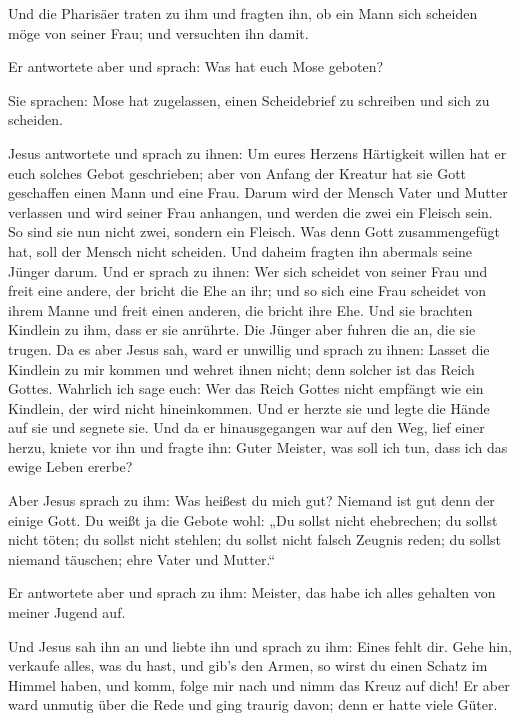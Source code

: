  Und die Pharisäer traten zu ihm und fragten ihn, ob ein
Mann sich scheiden möge von seiner Frau; und versuchten ihn damit.

 Er antwortete aber und sprach: Was hat euch Mose geboten?

 Sie sprachen: Mose hat zugelassen, einen Scheidebrief zu
schreiben und sich zu scheiden.

 Jesus antwortete und sprach zu ihnen: Um eures Herzens
Härtigkeit willen hat er euch solches Gebot geschrieben; 
aber von Anfang der Kreatur hat sie Gott geschaffen einen Mann und eine
Frau.  Darum wird der Mensch Vater und Mutter verlassen
und wird seiner Frau anhangen,  und werden die zwei ein
Fleisch sein. So sind sie nun nicht zwei, sondern ein Fleisch.
 Was denn Gott zusammengefügt hat, soll der Mensch nicht
scheiden.  Und daheim fragten ihn abermals seine Jünger
darum.  Und er sprach zu ihnen: Wer sich scheidet von
seiner Frau und freit eine andere, der bricht die Ehe an ihr;
 und so sich eine Frau scheidet von ihrem Manne und freit
einen anderen, die bricht ihre Ehe.  Und sie brachten
Kindlein zu ihm, dass er sie anrührte. Die Jünger aber fuhren die an,
die sie trugen.  Da es aber Jesus sah, ward er unwillig
und sprach zu ihnen: Lasset die Kindlein zu mir kommen und wehret ihnen
nicht; denn solcher ist das Reich Gottes.  Wahrlich ich
sage euch: Wer das Reich Gottes nicht empfängt wie ein Kindlein, der
wird nicht hineinkommen.  Und er herzte sie und legte die
Hände auf sie und segnete sie.  Und da er hinausgegangen
war auf den Weg, lief einer herzu, kniete vor ihn und fragte ihn: Guter
Meister, was soll ich tun, dass ich das ewige Leben ererbe?

 Aber Jesus sprach zu ihm: Was heißest du mich gut?
Niemand ist gut denn der einige Gott.  Du weißt ja die
Gebote wohl: „Du sollst nicht ehebrechen; du sollst nicht töten; du
sollst nicht stehlen; du sollst nicht falsch Zeugnis reden; du sollst
niemand täuschen; ehre Vater und Mutter.``

 Er antwortete aber und sprach zu ihm: Meister, das habe
ich alles gehalten von meiner Jugend auf.

 Und Jesus sah ihn an und liebte ihn und sprach zu ihm:
Eines fehlt dir. Gehe hin, verkaufe alles, was du hast, und gib's den
Armen, so wirst du einen Schatz im Himmel haben, und komm, folge mir
nach und nimm das Kreuz auf dich!  Er aber ward unmutig
über die Rede und ging traurig davon; denn er hatte viele Güter.

